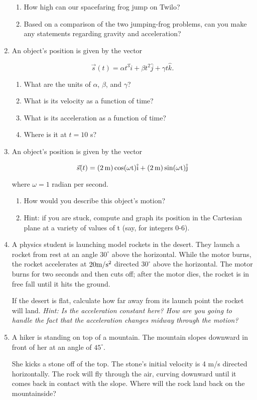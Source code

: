 \documentclass[12pt]{article}
\begin{document}
\begin{enumerate}
\begin{enumerate}
\item How high can our spacefaring frog jump on Twilo?
\item Based on a comparison of the two jumping-frog problems, can you make any statements regarding gravity and acceleration?
\end{enumerate}

\item An object's position is given by the vector 

$$\vec s(t) = \alpha t^3 \hat i + \beta t^2 \hat j + \gamma t\hat k.$$

\begin{enumerate}
\item What are the units of $\alpha$, $\beta$, and $\gamma$?
\item What is its velocity as a function of time?
\item What is its acceleration as a function of time?
\item Where is it at $t=10$ s?
\end{enumerate}

\item An object's position is given by the vector 

$$\vec s(t) = (2\, \rm m) \cos (\omega t) \hat i + (2\, \rm m) \sin (\omega t) \hat j$$

where $\omega = 1$ radian per second.

\begin{enumerate}
\item How would you describe this object's motion? 
\item Hint: if you are stuck, compute and graph its position in the Cartesian plane at a variety of values of t (say, for integers 0-6).
\end{enumerate}

\item A physics student is launching model rockets in the desert. They launch a rocket from rest at an angle $30^\circ$ above
the horizontal.
While the motor burns, the rocket accelerates at $20 \rm m/\rm s^2$ directed $30^\circ$ above
the horizontal. The motor burns for two seconds and then cuts off; after the motor dies, the rocket is in free fall
until it hits the ground.

If the desert is flat, calculate how far away from its launch point the rocket will land. {\it Hint: Is the acceleration
constant here? How are you going to handle the fact that the acceleration changes midway through the motion?}

\item A hiker is standing on top of a mountain. The mountain slopes downward in front of her at an angle of $45^\circ$.

She kicks a stone off of the top. The stone's initial velocity is 4 m/s directed horizontally. The rock will 
fly through the air, curving downward until it comes back in contact with the slope. Where will the rock 
land back on the mountainside?

\end{enumerate}
\end{document}
